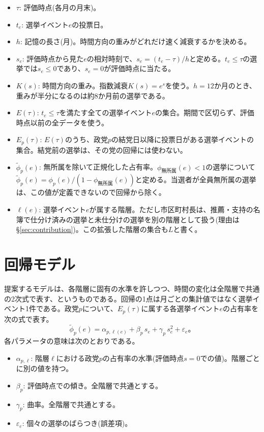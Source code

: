 \documentclass[a4paper,11pt]{ltjsarticle}
\begin{document}
\begin{itemize}
  \item $\tau$: 評価時点(各月の月末)。
  \item $t_e$: 選挙イベント$e$の投票日。
  \item $h$: 記憶の長さ(月)。時間方向の重みがどれだけ速く減衰するかを決める。
  \item $s_e$: 評価時点から見た$e$の相対時刻で、$s_e=(t_e-\tau)/h$と定める。$t_e\le\tau$の選挙では$s_e\le 0$であり、$s_e=0$が評価時点に当たる。
  \item $K(s)$: 時間方向の重み。指数減衰$K(s)=e^{s}$を使う。$h=12$か月のとき、重みが半分になるのは約8か月前の選挙である。
  \item $E(\tau)$: $t_e\le\tau$を満たす全ての選挙イベント$e$の集合。期間で区切らず、評価時点以前の全データを使う。
  \item $E_p(\tau)$: $E(\tau)$のうち、政党$p$の結党日以降に投票日がある選挙イベントの集合。結党前の選挙は、その党の回帰には使わない。
  \item $\tilde\phi_p(e)$: 無所属を除いて正規化した占有率。$\phi_{\text{無所属}}(e)<1$の選挙について$\tilde\phi_p(e)=\phi_p(e)/(1-\phi_{\text{無所属}}(e))$と定める。当選者が全員無所属の選挙は、この値が定義できないので回帰から除く。
  \item $\ell(e)$: 選挙イベント$e$が属する階層。ただし市区町村長は、推薦・支持の名簿で仕分け済みの選挙と未仕分けの選挙を別の階層として扱う(理由は\S\ref{sec:contribution})。この拡張した階層の集合も$L$と書く。
\end{itemize}

\section{回帰モデル}
\label{sec:model}

提案するモデルは、各階層に固有の水準を許しつつ、時間の変化は全階層で共通の2次式で表す、というものである。回帰の1点は月ごとの集計値ではなく選挙イベント1件である。政党$p$について、$E_p(\tau)$に属する各選挙イベント$e$の占有率を次の式で表す。
\begin{equation}
  \tilde\phi_p(e) = \alpha_{p,\ell(e)} + \beta_p\, s_e + \gamma_p\, s_e^2 + \varepsilon_e。
  \label{eq:model}
\end{equation}
各パラメータの意味は次のとおりである。

\begin{itemize}
  \item $\alpha_{p,\ell}$: 階層$\ell$における政党$p$の占有率の水準(評価時点$s=0$での値)。階層ごとに別の値を持つ。
  \item $\beta_p$: 評価時点での傾き。全階層で共通とする。
  \item $\gamma_p$: 曲率。全階層で共通とする。
  \item $\varepsilon_e$: 個々の選挙のばらつき(誤差項)。
\end{itemize}
\end{document}
